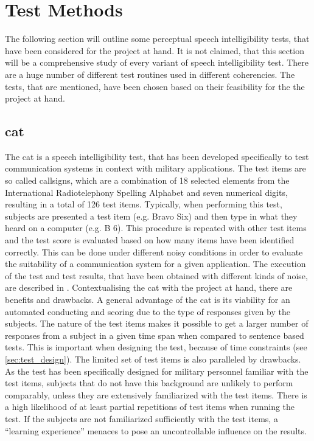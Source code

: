\section{Test Methods}\label{sec:methods}
The following section will outline some perceptual speech intelligibility tests, that have been considered for the project at hand. It is not claimed, that this section will be a comprehensive study of every variant of speech intelligibility test. There are a huge number of different test routines used in different coherencies. The tests, that are mentioned, have been chosen based on their feasibility for the the project at hand.

\subsection{\gls{cat}}\label{ssec:cat}
The \gls{cat} is a speech intelligibility test, that has been developed specifically to test communication systems in context with military applications. The test items are so called callsigns, which are a combination of 18 selected elements from the International Radiotelephony Spelling Alphabet and seven numerical digits, resulting in a total of 126 test items.
Typically, when performing this test, subjects are presented a test item (e.g. Bravo Six) and then type in what they heard on a computer (e.g. B 6). This procedure is repeated with other test items and the test score is evaluated based on how many items have been identified correctly.
This can be done under different noisy conditions in order to evaluate the suitability of a communication system for a given application.
The execution of the test and test results, that have been obtained with different kinds of noise, are described in \citep{rao_2006}.
Contextualising the \gls{cat} with the project at hand, there are benefits and drawbacks. A general advantage of the \gls{cat} is its viability for an automated conducting and scoring due to the type of responses given by the subjects. The nature of the test items makes it possible to get a larger number of responses from a subject in a given time span when compared to sentence based tests.
This is important when designing the test, because of time constraints (see \autoref{sec:test_design}).
The limited set of test items is also paralleled by drawbacks. As the test has been specifically designed for military personnel familiar with the test items, subjects that do not have this background are unlikely to perform comparably, unless they are extensively familiarized with the test items. There is a high likelihood of at least partial repetitions of test items when running the test. If the subjects are not familiarized sufficiently with the test items, a \enquote{learning experience} menaces to pose an uncontrollable influence on the results.

